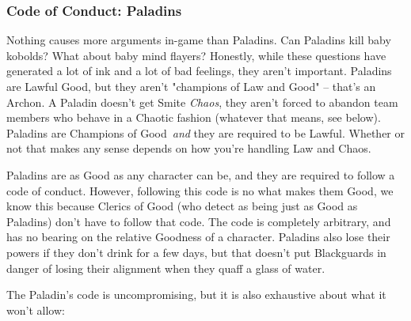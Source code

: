 \subsubsection{Code of Conduct: Paladins}
Nothing causes more arguments in-game than Paladins. Can Paladins kill baby kobolds? What about baby mind flayers? Honestly, while these questions have generated a lot of ink and a lot of bad feelings, they aren't important. Paladins are Lawful Good, but they aren't "champions of Law and Good" -- that's an Archon. A Paladin doesn't get Smite \textit{Chaos}, they aren't forced to abandon team members who behave in a Chaotic fashion (whatever that means, see below). Paladins are Champions of Good\texttrademark\ \textit{and} they are required to be Lawful. Whether or not that makes any sense depends on how you're handling Law and Chaos.

Paladins are as Good as any character can be, and they are required to follow a code of conduct. However, following this code is no what makes them Good, we know this because Clerics of Good (who detect as being just as Good as Paladins) don't have to follow that code. The code is completely arbitrary, and has no bearing on the relative Goodness of a character. Paladins also lose their powers if they don't drink for a few days, but that doesn't put Blackguards in danger of losing their alignment when they quaff a glass of water.

The Paladin's code is uncompromising, but it is also exhaustive about what it won't allow:

